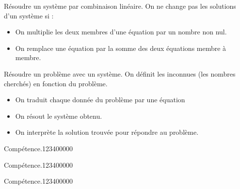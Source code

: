 \begin{pageCours}
\begin{PpT}{Résoudre un système par combinaison linéaire.}
On ne change pas les solutions d'un système si :
\begin{itemize}
\item On multiplie les deux membres d'une équation par un nombre non nul.
\item On remplace une équation par la somme des deux équations membre à membre.
\end{itemize}
\end{PpT}

\begin{MtT}{Résoudre un problème avec un système.}
On définit les inconnues (les nombres cherchés) en fonction du problème.
\begin{itemize}
\item On traduit chaque donnée du problème par une équation
\item On résout le système obtenu.
\item On interprète la solution trouvée pour répondre au problème.
\end{itemize}
\end{MtT}

\end{pageCours} %


\begin{pageAD}  %
\restoregeometry %


\begin{ExoCad}{Compétence.}{1234}{0}{0}{0}{0}{0}

\end{ExoCad}


\begin{ExoCad}{Compétence.}{1234}{0}{0}{0}{0}{0}

\end{ExoCad}


\begin{ExoCad}{Compétence.}{1234}{0}{0}{0}{0}{0}

\end{ExoCad}
 
\end{pageAD} %

